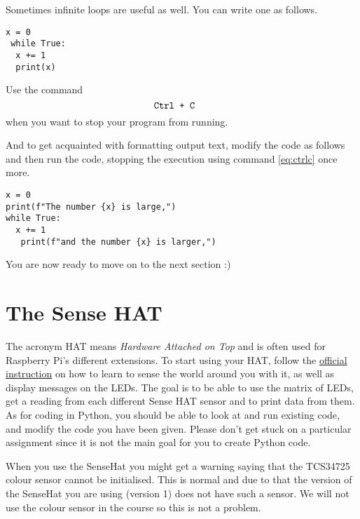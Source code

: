 \documentclass{article}
\begin{document}
Sometimes infinite loops are useful as well.
You can write one as follows.
\begin{center}
    \verb!x = 0      !\\
    \verb! while True:!\\
    \verb!  x += 1   !\\
    \verb!  print(x) !
\end{center}
Use the command
\begin{equation}
\label{eq:ctrlc}
\verb!Ctrl + C   !
\end{equation}
when you want to stop your program from running.

\newpage
And to get acquainted with formatting output text, modify the code as follows and then run the code, stopping the execution using command \eqref{eq:ctrlc} once more.
\begin{center}
    \verb!x = 0                                    !\\
    \verb!print(f"The number {x} is large,")       !\\
    \verb!while True:                              !\\
    \verb!  x += 1                                 !\\
    \verb!   print(f"and the number {x} is larger,")!\\
\end{center}
You are now ready to move on to the next section :)

\section{The Sense HAT}
The acronym HAT means \emph{Hardware Attached on Top} and is often used for Raspberry Pi's different extensions. To start using your HAT, follow the {\color{blue}\href{https://projects.raspberrypi.org/en/projects/getting-started-with-the-sense-hat/0}{official instruction}} on how to learn to sense the world around you with it, as well as display messages on the LEDs. The goal is to be able to use the matrix of LEDs, get a reading from each different Sense HAT sensor and to print data from them. As for coding in Python, you should be able to look at and run existing code, and modify the code you have been given. Please don't get stuck on a particular assignment since it is not the main goal for you to create Python code.\\

\parbox[t]{14cm}{When you use the SenseHat you might get a warning saying that the TCS34725 colour sensor cannot be initialised. This is normal and due to that the version of the SenseHat you are using (version 1) does not have such a sensor. We will not use the colour sensor in the course so this is not a problem.}
\end{document}
